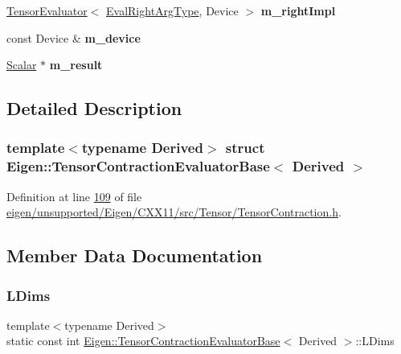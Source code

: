 \begin{DoxyCompactItemize}
\hyperlink{struct_eigen_1_1_tensor_evaluator}{Tensor\+Evaluator}$<$ \hyperlink{class_eigen_1_1internal_1_1_tensor_lazy_evaluator_writable}{Eval\+Right\+Arg\+Type}, Device $>$ {\bfseries m\+\_\+right\+Impl}
\item 
\mbox{\label{struct_eigen_1_1_tensor_contraction_evaluator_base_a30e8f970e26a5bf99c22553f66dae12d}} 
const Device \& {\bfseries m\+\_\+device}
\item 
\mbox{\label{struct_eigen_1_1_tensor_contraction_evaluator_base_af5ee8863ab56ef0c014c48cb68a88c28}} 
\hyperlink{group___sparse_core___module}{Scalar} $\ast$ {\bfseries m\+\_\+result}
\end{DoxyCompactItemize}


\subsection{Detailed Description}
\subsubsection*{template$<$typename Derived$>$\newline
struct Eigen\+::\+Tensor\+Contraction\+Evaluator\+Base$<$ Derived $>$}



Definition at line \hyperlink{eigen_2unsupported_2_eigen_2_c_x_x11_2src_2_tensor_2_tensor_contraction_8h_source_l00109}{109} of file \hyperlink{eigen_2unsupported_2_eigen_2_c_x_x11_2src_2_tensor_2_tensor_contraction_8h_source}{eigen/unsupported/\+Eigen/\+C\+X\+X11/src/\+Tensor/\+Tensor\+Contraction.\+h}.



\subsection{Member Data Documentation}
\mbox{\label{struct_eigen_1_1_tensor_contraction_evaluator_base_a87ce6b6099f0d4fc6356c22dfb143349}} 
\subsubsection{\texorpdfstring{L\+Dims}{LDims}}
{\footnotesize\ttfamily template$<$typename Derived$>$ \\
static const int \hyperlink{struct_eigen_1_1_tensor_contraction_evaluator_base}{Eigen\+::\+Tensor\+Contraction\+Evaluator\+Base}$<$ Derived $>$\+::L\+Dims\hspace{0.3cm}{\ttfamily [static]}}

